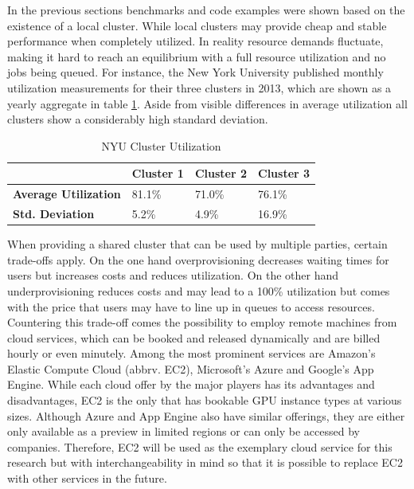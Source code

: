 In the previous sections benchmarks and code examples were shown based on the existence of a local cluster.
While local clusters may provide cheap and stable performance when completely utilized. In reality resource demands fluctuate, making it hard to reach an equilibrium with a full resource utilization and no jobs being queued. For instance, the New York University published monthly utilization measurements for their three clusters in 2013\cite{nyu}, which are shown as a yearly aggregate in table \ref{table:cluster_utilization}. Aside from visible differences in average utilization all clusters show a considerably high standard deviation.

\begin{table}[!htb]
	\centering
	\begin{adjustbox}{width=0.5\textwidth}
		\small
		\begin{tabular}{l | l | l | l}
			~						& \textbf{Cluster 1}	& \textbf{Cluster 2}	& \textbf{Cluster 3}                 \\
			\hline
			\textbf{Average Utilization} 	& 81.1\%  	& 71.0\% 	& 76.1\% \\
			\textbf{Std. Deviation}          & 5.2\%  	& 4.9\%		& 16.9\% \\
		\end{tabular}
	\end{adjustbox}
	
	\caption{NYU Cluster Utilization}
	\label{table:cluster_utilization}
\end{table}

When providing a shared cluster that can be used by multiple parties, certain trade-offs apply. On the one hand overprovisioning decreases waiting times for users but increases costs and reduces utilization. On the other hand underprovisioning reduces costs and may lead to a 100\% utilization but comes with the price that users may have to line up in queues to access resources. Countering this trade-off comes the possibility to employ remote machines from cloud services, which can be booked and released dynamically and are billed hourly or even minutely. Among the most prominent services are Amazon's Elastic Compute Cloud (abbrv. EC2), Microsoft's Azure and Google's App Engine. While each cloud offer by the major players has its advantages and disadvantages, EC2 is the only that has bookable GPU instance types at various sizes. Although Azure and App Engine also have similar offerings, they are either only available as a preview in limited regions or can only be accessed by companies. Therefore, EC2 will be used as the exemplary cloud service for this research but with interchangeability in mind so that it is possible to replace EC2 with other services in the future.

